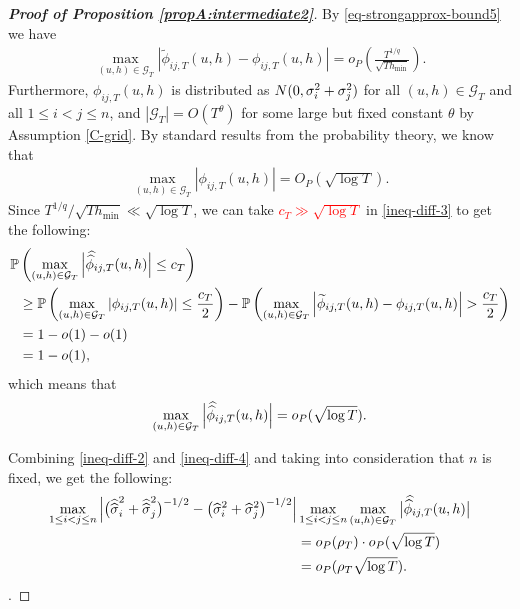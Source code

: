 \begin{proof}[\textnormal{\textbf{Proof of Proposition \ref{propA:intermediate2}}}]
By \eqref{eq-strongapprox-bound5} we have
\begin{align*}
\max_{(u,h) \in \mathcal{G}_T}\left|\widetilde{\phi}_{ij, T}(u, h) - \phi_{ij, T}(u, h)\right| = o_P\left(\frac{T^{1/q}}{\sqrt{Th_{\min}}}\right).
\end{align*}
Furthermore, $\phi_{ij, T}(u,h)$ is distributed as $ N(0,{\sigma}^2_i + {\sigma}^2_j)$ for all $(u,h) \in \mathcal{G}_T$ and all \linebreak $1\le i < j \le n$, and $|\mathcal{G}_T| = O(T^\theta)$ for some large but fixed constant $\theta$ by \linebreak Assumption \ref{C-grid}. By standard results from the probability theory, we know that
\begin{align*}
\max_{(u,h) \in \mathcal{G}_T}\left|\phi_{ij, T}(u, h)\right| = O_P(\sqrt{\log{T}}).
\end{align*}
Since $T^{1/q}/\sqrt{T h_{\min}} \ll \sqrt{\log T}$, we can take \textcolor{red}{$c_T \gg \sqrt{\log{T}}$} in \eqref{ineq-diff-3} to get the following:
\begin{align*}
\pr&\left(\max_{(u,h) \in \mathcal{G}_T}\Big|\doublehat{\phi}_{ij, T}(u, h)\Big| \leq c_T\right)\\
&\geq \pr \left(\max_{(u,h) \in \mathcal{G}_T}\left|\phi_{ij, T}(u, h)\right| \leq \frac{c_T}{2}\right) - \pr\left(\max_{(u,h) \in \mathcal{G}_T}\left|\widetilde{\phi}_{ij, T}(u, h) - \phi_{ij, T}(u, h)\right| > \frac{c_T}{2} \right)  \\
&= 1 - o(1) - o(1) \\
&= 1 - o(1),
\end{align*}
which means that
\begin{align}\label{ineq-diff-4}
\max_{(u,h) \in \mathcal{G}_T}\Big|\doublehat{\phi}_{ij, T}(u, h)\Big| =o_P(\sqrt{\log{T}}).
\end{align}

Combining \eqref{ineq-diff-2} and \eqref{ineq-diff-4} and taking into consideration that $n$ is fixed, we get the following:
{\color{red}\begin{align}\label{ineq-diff-5}
\begin{split}
\max_{1 \le i < j \le n} \Big|\big(\doublehattwo{\sigma}_i^2 + \doublehattwo{\sigma}_j^2 \big)^{-1/2} - \big(\widehat{\sigma}_i^2 + \widehat{\sigma}_j^2 \big)^{-1/2}\Big|&\max_{1 \le i< j \le n} \max_{(u,h) \in \mathcal{G}_T} \big|\doublehat{\phi}_{ij,T}(u,h)\big| \\
&= o_P(\rho_T) \cdot o_P(\sqrt{\log{T}}) \\
& = o_P(\rho_T \sqrt{\log{T}}).
\end{split}
\end{align}}
.


\end{proof}
